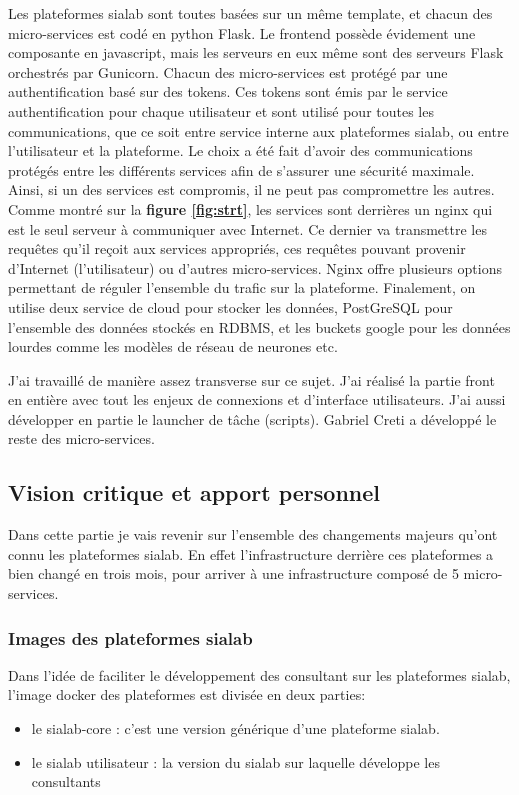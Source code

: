 \documentclass{article} %
\begin{document}
Les plateformes sialab sont toutes basées sur un même template, et chacun des micro-services est codé en python Flask. Le frontend possède évidement une composante en javascript, mais les serveurs en eux même sont des serveurs Flask orchestrés par Gunicorn. Chacun des micro-services est protégé par une authentification basé sur des tokens. Ces tokens sont émis par le service authentification pour chaque utilisateur et sont utilisé pour toutes les communications, que ce soit entre service interne aux plateformes sialab, ou entre l'utilisateur et la plateforme. Le choix a été fait d'avoir des communications protégés entre les différents services afin de s'assurer une sécurité maximale. Ainsi, si un des services est compromis, il ne peut pas compromettre les autres.\\

Comme montré sur la \textbf{figure \ref{fig:strt}}, les services sont derrières un nginx \cite{nginx} qui est le seul serveur à communiquer avec Internet. Ce dernier va transmettre les requêtes qu'il reçoit aux services appropriés, ces requêtes pouvant provenir d'Internet (l'utilisateur) ou d'autres micro-services. Nginx offre plusieurs options permettant de réguler l'ensemble du trafic sur la plateforme. Finalement, on utilise deux service de cloud pour stocker les données, PostGreSQL pour l'ensemble des données stockés en RDBMS, et les buckets google pour les données lourdes comme les modèles de réseau de neurones etc. 

J'ai travaillé de manière assez transverse sur ce sujet. J'ai réalisé la partie front en entière avec tout les enjeux de connexions et d'interface utilisateurs. J'ai aussi développer en partie le launcher de tâche (scripts). Gabriel Creti a développé le reste des micro-services.


\subsection{Vision critique et apport personnel}
Dans cette partie je vais revenir sur l'ensemble des changements majeurs qu'ont connu les plateformes sialab. En effet l'infrastructure derrière ces plateformes a bien changé en trois mois, pour arriver à une infrastructure composé de 5 micro-services.

\subsubsection{Images des plateformes sialab}
Dans l'idée de faciliter le développement des consultant sur les plateformes sialab, l'image docker des plateformes est divisée en deux parties:
\begin{itemize}
	\item le sialab-core : c'est une version générique d'une plateforme sialab.
	\item le sialab utilisateur : la version du sialab sur laquelle développe les consultants
\end{itemize}
\end{document}
